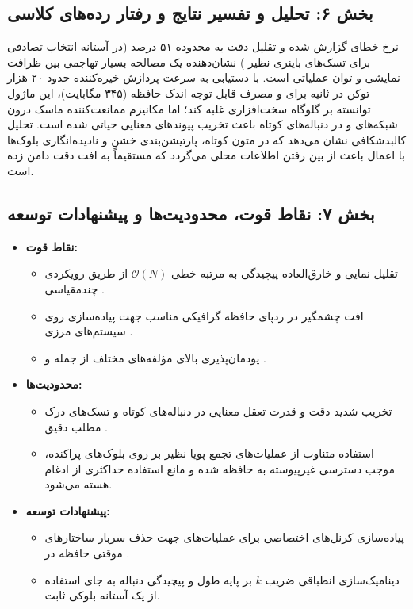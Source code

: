 \subsection*{بخش ۶: تحلیل و تفسیر نتایج و رفتار رده‌های کلاسی }
نرخ خطای گزارش شده و تقلیل دقت به محدوده ۵۱ درصد (در آستانه انتخاب تصادفی برای تسک‌های باینری نظیر ) نشان‌دهنده یک مصالحه بسیار تهاجمی بین ظرافت نمایشی  و توان عملیاتی است. با دستیابی به سرعت پردازش خیره‌کننده حدود ۲۰ هزار توکن در ثانیه برای  و مصرف قابل توجه اندک حافظه (۳۴۵ مگابایت)، این ماژول توانسته بر گلوگاه سخت‌افزاری غلبه کند؛ اما مکانیزم ممانعت‌کننده ماسک  درون شبکه‌های  و  در دنباله‌های کوتاه باعث تخریب پیوندهای معنایی حیاتی شده است. تحلیل کالبدشکافی نشان می‌دهد که در متون کوتاه، پارتیشن‌بندی خشن و نادیده‌انگاری بلوک‌ها با اعمال  باعث از بین رفتن اطلاعات محلی می‌گردد که مستقیماً به افت دقت دامن زده است.

\subsection*{بخش ۷: نقاط قوت، محدودیت‌ها و پیشنهادات توسعه }
\begin{itemize}
    \item \textbf{نقاط قوت:} 
    \begin{itemize}
        \item تقلیل نمایی و خارق‌العاده پیچیدگی به مرتبه خطی $\mathcal{O}(N)$ از طریق رویکردی چندمقیاسی .
        \item افت چشمگیر در ردپای حافظه گرافیکی  مناسب جهت پیاده‌سازی روی سیستم‌های مرزی .
        \item پودمان‌پذیری بالای مؤلفه‌های مختلف از جمله  و .
    \end{itemize}
    \item \textbf{محدودیت‌ها:}
    \begin{itemize}
        \item تخریب شدید دقت و قدرت تعقل معنایی در دنباله‌های کوتاه و تسک‌های درک مطلب دقیق .
        \item استفاده متناوب از عملیات‌های تجمع پویا نظیر  بر روی بلوک‌های پراکنده، موجب دسترسی غیرپیوسته به حافظه شده و مانع استفاده حداکثری از ادغام هسته  می‌شود.
    \end{itemize}
    \item \textbf{پیشنهادات توسعه:}
    \begin{itemize}
        \item پیاده‌سازی کرنل‌های اختصاصی  برای عملیات‌های  جهت حذف سربار ساختارهای موقتی حافظه در .
        \item دینامیک‌سازی انطباقی ضریب $k$ بر پایه طول و پیچیدگی دنباله به جای استفاده از یک آستانه بلوکی ثابت.
    \end{itemize}
\end{itemize}

